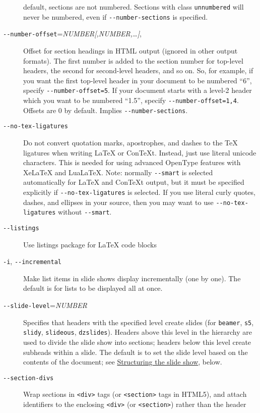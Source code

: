 \documentclass[]{article}
\begin{document}
\begin{description}
default, sections are not numbered. Sections with class
\texttt{unnumbered} will never be numbered, even if
\texttt{-{}-number-sections} is specified.
\item[\texttt{-{}-number-offset}=\emph{NUMBER{[},NUMBER,\ldots{}{]}},]
Offset for section headings in HTML output (ignored in other output
formats). The first number is added to the section number for top-level
headers, the second for second-level headers, and so on. So, for
example, if you want the first top-level header in your document to be
numbered ``6'', specify \texttt{-{}-number-offset=5}. If your document
starts with a level-2 header which you want to be numbered ``1.5'',
specify \texttt{-{}-number-offset=1,4}. Offsets are 0 by default.
Implies \texttt{-{}-number-sections}.
\item[\texttt{-{}-no-tex-ligatures}]
Do not convert quotation marks, apostrophes, and dashes to the TeX
ligatures when writing LaTeX or ConTeXt. Instead, just use literal
unicode characters. This is needed for using advanced OpenType features
with XeLaTeX and LuaLaTeX. Note: normally \texttt{-{}-smart} is selected
automatically for LaTeX and ConTeXt output, but it must be specified
explicitly if \texttt{-{}-no-tex-ligatures} is selected. If you use
literal curly quotes, dashes, and ellipses in your source, then you may
want to use \texttt{-{}-no-tex-ligatures} without \texttt{-{}-smart}.
\item[\texttt{-{}-listings}]
Use listings package for LaTeX code blocks
\item[\texttt{-i}, \texttt{-{}-incremental}]
Make list items in slide shows display incrementally (one by one). The
default is for lists to be displayed all at once.
\item[\texttt{-{}-slide-level}=\emph{NUMBER}]
Specifies that headers with the specified level create slides (for
\texttt{beamer}, \texttt{s5}, \texttt{slidy}, \texttt{slideous},
\texttt{dzslides}). Headers above this level in the hierarchy are used
to divide the slide show into sections; headers below this level create
subheads within a slide. The default is to set the slide level based on
the contents of the document; see
\hyperref[structuring-the-slide-show]{Structuring the slide show},
below.
\item[\texttt{-{}-section-divs}]
Wrap sections in \texttt{\textless{}div\textgreater{}} tags (or
\texttt{\textless{}section\textgreater{}} tags in HTML5), and attach
identifiers to the enclosing \texttt{\textless{}div\textgreater{}} (or
\texttt{\textless{}section\textgreater{}}) rather than the header

\end{description}
\end{document}
